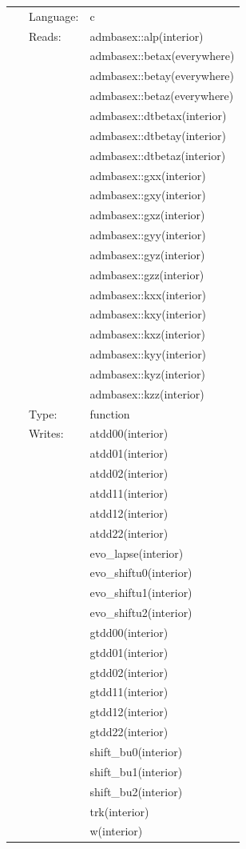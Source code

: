  \begin{tabular*}{160mm}{cll} 
~ & Language:  & c \\ 
~ & Reads:  & admbasex::alp(interior) \\ 
~& ~ &admbasex::betax(everywhere)\\ 
~& ~ &admbasex::betay(everywhere)\\ 
~& ~ &admbasex::betaz(everywhere)\\ 
~& ~ &admbasex::dtbetax(interior)\\ 
~& ~ &admbasex::dtbetay(interior)\\ 
~& ~ &admbasex::dtbetaz(interior)\\ 
~& ~ &admbasex::gxx(interior)\\ 
~& ~ &admbasex::gxy(interior)\\ 
~& ~ &admbasex::gxz(interior)\\ 
~& ~ &admbasex::gyy(interior)\\ 
~& ~ &admbasex::gyz(interior)\\ 
~& ~ &admbasex::gzz(interior)\\ 
~& ~ &admbasex::kxx(interior)\\ 
~& ~ &admbasex::kxy(interior)\\ 
~& ~ &admbasex::kxz(interior)\\ 
~& ~ &admbasex::kyy(interior)\\ 
~& ~ &admbasex::kyz(interior)\\ 
~& ~ &admbasex::kzz(interior)\\ 
~ & Type:  & function \\ 
~ & Writes:  & atdd00(interior) \\ 
~& ~ &atdd01(interior)\\ 
~& ~ &atdd02(interior)\\ 
~& ~ &atdd11(interior)\\ 
~& ~ &atdd12(interior)\\ 
~& ~ &atdd22(interior)\\ 
~& ~ &evo\_lapse(interior)\\ 
~& ~ &evo\_shiftu0(interior)\\ 
~& ~ &evo\_shiftu1(interior)\\ 
~& ~ &evo\_shiftu2(interior)\\ 
~& ~ &gtdd00(interior)\\ 
~& ~ &gtdd01(interior)\\ 
~& ~ &gtdd02(interior)\\ 
~& ~ &gtdd11(interior)\\ 
~& ~ &gtdd12(interior)\\ 
~& ~ &gtdd22(interior)\\ 
~& ~ &shift\_bu0(interior)\\ 
~& ~ &shift\_bu1(interior)\\ 
~& ~ &shift\_bu2(interior)\\ 
~& ~ &trk(interior)\\ 
~& ~ &w(interior)\\ 
\end{tabular*} 


